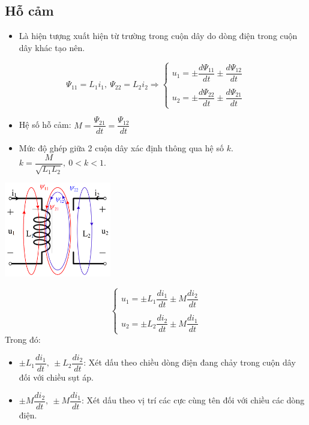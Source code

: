 \subsection{Hỗ cảm}
\begin{itemize}
  \item Là hiện tượng xuất hiện từ trường trong cuộn dây do dòng điện trong cuộn dây khác tạo nên.
\end{itemize}
\begin{equation}
  \Psi_{11} = L_1i_1,\ \Psi_{22} = L_2i_2 \Rightarrow 
  \begin{cases}
    u_1 = \pm\dfrac{d\Psi_{11}}{dt}\pm\dfrac{d\Psi_{12}}{dt} \\ \\
    u_2 = \pm\dfrac{d\Psi_{22}}{dt}\pm\dfrac{d\Psi_{21}}{dt} 
  \end{cases}
\end{equation}
\begin{itemize}
  \item Hệ số hỗ cảm: $M = \dfrac{\Psi_{21}}{dt} = \dfrac{\Psi_{12}}{dt}$
  \item Mức độ ghép giữa 2 cuộn dây xác định thông qua hệ số $k$. $k = \dfrac{M}{\sqrt{L_1L_2}},\ 0<k<1$.
\end{itemize}
\begin{center}
  \includegraphics[width=0.35\textwidth]{./image/7.png}
\end{center}
\begin{equation}
  \begin{cases}
    u_1 = \pm L_1\dfrac{di_1}{dt}\pm M\dfrac{di_2}{dt} \\ \\
    u_2 = \pm L_2\dfrac{di_2}{dt}\pm M\dfrac{di_1}{dt}
  \end{cases}
\end{equation}
Trong đó:
\begin{itemize}
  \item $\pm L_1\dfrac{di_1}{dt},\ \pm L_2\dfrac{di_2}{dt}$: Xét dấu theo chiều dòng điện đang chảy trong cuộn dây đối với chiều sụt áp.
  \item $\pm M\dfrac{di_2}{dt},\ \pm M\dfrac{di_1}{dt}$: Xét dấu theo vị trí các cực cùng tên đối với chiều các dòng điện.
\end{itemize}
